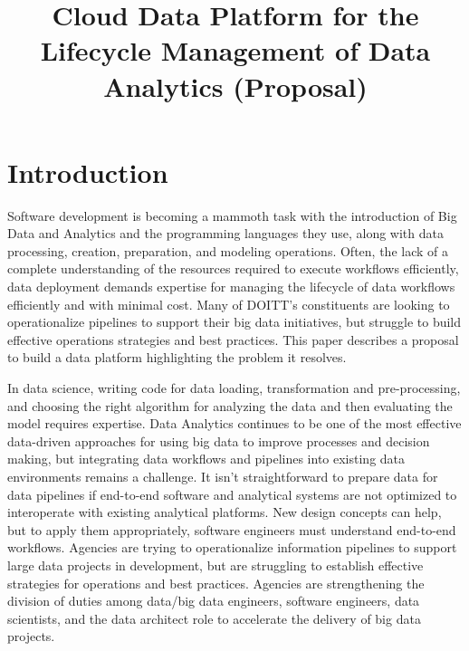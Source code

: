 \documentclass[conference]{IEEEtran}
\begin{document}
%
\title{Cloud Data Platform for the Lifecycle Management of Data Analytics (Proposal)}


\author{
	\and

}
\maketitle{}

\section{Introduction}
Software development is becoming a mammoth task with the introduction of Big Data and Analytics and the programming languages they use, along with data processing, creation, preparation, and modeling operations. Often, the lack of a complete understanding of the resources required to execute workflows efficiently, data deployment demands expertise for managing the lifecycle of data workflows efficiently and with minimal cost.  Many of DOITT's constituents are looking to operationalize pipelines to support their big data initiatives, but struggle to build effective operations strategies and best practices.  This paper describes a proposal to build a data platform highlighting the problem it resolves.

In data science, writing code for data loading, transformation and pre-processing, and choosing the right algorithm for analyzing the data and then evaluating the model requires expertise.  Data Analytics continues to be one of the most effective data-driven approaches for using big data to improve processes and decision making, but integrating data workflows and pipelines into existing data environments remains a challenge. It isn't straightforward to prepare data for data pipelines if end-to-end software and analytical systems are not optimized to interoperate with existing analytical platforms. New design concepts can help, but to apply them appropriately, software engineers must understand end-to-end workflows.  Agencies are trying to operationalize information pipelines to support large data projects in development, but are struggling to establish effective strategies for operations and best practices.  Agencies are strengthening the division of duties among data/big data engineers, software engineers, data scientists, and the data architect role to accelerate the delivery of big data projects. 
\end{document}

